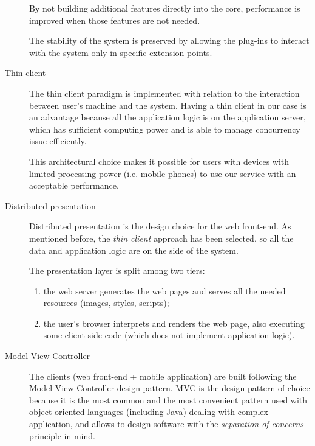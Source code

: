 \begin{description}
By not building additional features directly into the core, performance is improved when those features are not needed.

The stability of the system is preserved by allowing the plug-ins to interact with the system only in specific extension points.

\item[Thin client] The thin client paradigm is implemented with relation to the interaction between user's machine and the system.
Having a thin client in our case is an advantage because all the application logic is on the application server, which has sufficient computing power and is able to manage concurrency issue efficiently.

This architectural choice makes it possible for users with devices with limited processing power (i.e. mobile phones) to use our service with an acceptable performance.

\item[Distributed presentation]
Distributed presentation is the design choice for the web front-end.
As mentioned before, the \emph{thin client} approach has been selected, so all the data and application logic are on the side of the system.

The presentation layer is split among two tiers:
\begin{enumerate}
    \item the web server generates the web pages and serves all the needed resources (images, styles, scripts);
    \item the user's browser interprets and renders the web page, also executing some client-side code (which does not implement application logic).
\end{enumerate}

\item[Model-View-Controller]
The clients (web front-end + mobile application) are built following the Model-View-Controller design pattern.
MVC is the design pattern of choice because it is the most common and the most convenient pattern used with object-oriented languages (including Java) dealing with complex application, and allows to design software with the \emph{separation of concerns} principle in mind.
\end{description}
